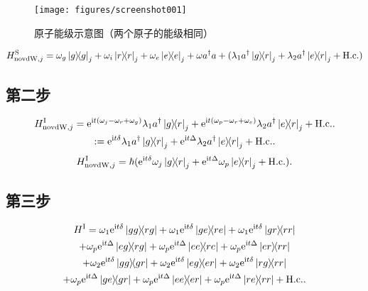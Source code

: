 \documentclass[
fontsetup = font-setup-open.tex,
titlesetup = titles-setup.tex
]{AJbook}
\numberwithin{equation}{section}
\begin{document}
\begin{figure}[htbp]
\centering
\texttt{[image: figures/screenshot001]}
\caption{原子能级示意图（两个原子的能级相同）}
\label{fig:screenshot001}
\end{figure}

\begin{equation}\label{key}
H_{\mathrm{novdW},j}^\mathrm{S}=\omega_g\ketbra{g}{g}_j+\omega_i\ketbra{r}{r}_j+\omega_e\ketbra{e}{e}_j+\omega a^\dagger a+(\lambda_1a^\dagger\ketbra{g}{r}_j+\lambda_2a^\dagger\ketbra{e}{r}_j+\mathrm{H.c.})
\end{equation}
\subsection{第二步}
\begin{multline}
H_{\mathrm{novdW},j}^\mathrm{I}=\mathrm{e}^{\mathrm{i}t(\omega_j-\omega_r+\omega_g)}\lambda_1 a^\dagger\ketbra{g}{r}_j+\mathrm{e}^{\mathrm{i}t(\omega_p-\omega_r+\omega_e)}\lambda_2 a^\dagger\ketbra{e}{r}_j+\mathrm{H.c.}.
\\:=\mathrm{e}^{\mathrm{i}t\delta}\lambda_1 a^\dagger\ketbra{g}{r}_j+\mathrm{e}^{\mathrm{i}t\Delta}\lambda_2 a^\dagger\ketbra{e}{r}_j+\mathrm{H.c.}.
\end{multline}
\begin{equation}
H_{\mathrm{novdW},j}^\mathrm{I}=\hbar(\mathrm{e}^{\mathrm{i}t\delta}\omega_j\ketbra{g}{r}_j+\mathrm{e}^{\mathrm{i}t\Delta}\omega_p\ketbra{e}{r}_j+\mathrm{H.c.}).
\end{equation}
\subsection{第三步}
\begin{multline}
H^\mathrm{I}
=\omega_1\mathrm{e}^{\mathrm{i}t\delta}\ketbra{gg}{rg}
+\omega_1\mathrm{e}^{\mathrm{i}t\delta}\ketbra{ge}{re}
+\omega_1\mathrm{e}^{\mathrm{i}t\delta}\ketbra{gr}{rr}\\
+\omega_p\mathrm{e}^{\mathrm{i}t\Delta}\ketbra{eg}{rg}
+\omega_p\mathrm{e}^{\mathrm{i}t\Delta}\ketbra{ee}{re}
+\omega_p\mathrm{e}^{\mathrm{i}t\Delta}\ketbra{er}{rr}\\
+\omega_2\mathrm{e}^{\mathrm{i}t\delta}\ketbra{gg}{gr}
+\omega_2\mathrm{e}^{\mathrm{i}t\delta}\ketbra{eg}{er}
+\omega_2\mathrm{e}^{\mathrm{i}t\delta}\ketbra{rg}{rr}\\
+\omega_p\mathrm{e}^{\mathrm{i}t\Delta}\ketbra{ge}{gr}
+\omega_p\mathrm{e}^{\mathrm{i}t\Delta}\ketbra{ee}{er}
+\omega_p\mathrm{e}^{\mathrm{i}t\Delta}\ketbra{re}{rr}
+\mathrm{H.c.}.
\end{multline}
\end{document}
